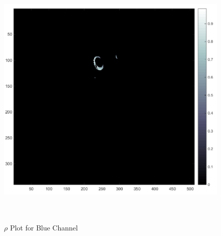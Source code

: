 \documentclass[11pt,psfig]{article}
\begin{document}
\begin{figure}[H]
\centering
\includegraphics[height=5in]{prob4rhoPlot3.png}
\caption{$\rho$ Plot for Blue Channel}
\end{figure} 
\end{document}

